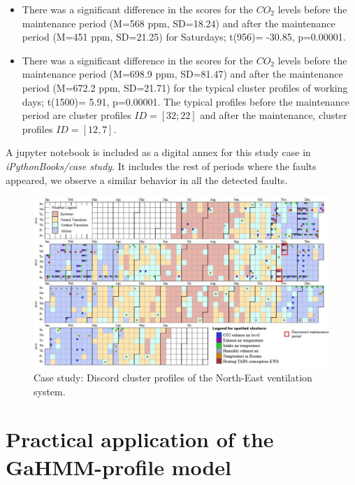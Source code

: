 \begin{itemize}
\item There was a significant difference in the scores for the $CO_2$ levels before the maintenance period (M=568 ppm, SD=18.24) and after the maintenance period (M=451 ppm, SD=21.25) for Saturdays; t(956)= -30.85, p=0.00001.  
\item There was a significant difference in the scores for the $CO_2$ levels before the maintenance period (M=698.9 ppm, SD=81.47) and after the maintenance period (M=672.2 ppm, SD=21.71) for the typical cluster profiles of working days; t(1500)= 5.91, p=0.00001. The typical profiles before the maintenance period are cluster profiles $ID=[32; 22]$ and after the maintenance, cluster profiles $ID=[12, 7]$.   
\end{itemize}

A jupyter notebook is included as a digital annex for this study case in \textit{iPythonBooks/case study}. It includes the rest of periods where the faults appeared, we observe a similar behavior in all the detected faults.   

\begin{landscape}
\leavevmode
\newline

\begin{figure}[h!]
  \vspace{0.5em} %
  \includegraphics[scale=0.85]{Figures/case_study_complete.jpg}
  \caption{Case study: Discord cluster profiles of the North-East ventilation system.}
  \label{fig:case-study}
\end{figure}

\end{landscape}
\restoregeometry


\section{Practical application of the GaHMM-profile model}
\label{sec:pract_app}
